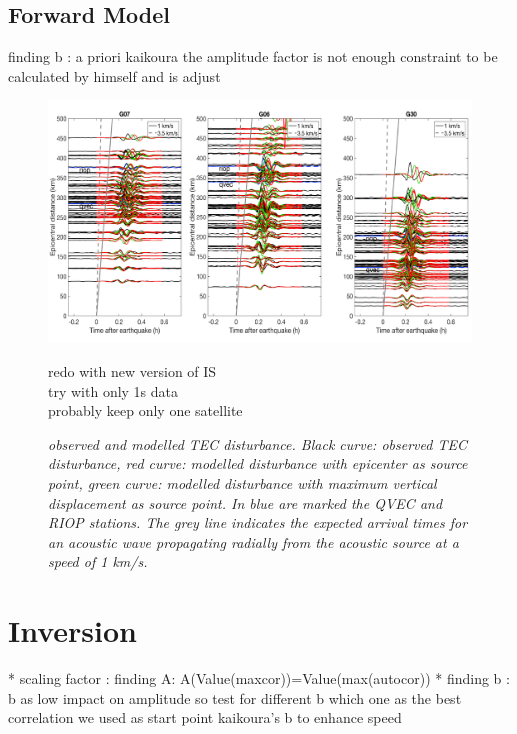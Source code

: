 \documentclass{gji}
\begin{document}
    
   
\subsection{Forward Model}

finding b : a priori kaikoura  
the amplitude factor is not enough constraint to be calculated by himself and is adjust \begin{figure}

\includegraphics[width=0.9\linewidth]{images/Hodo_all_cropped.pdf}

redo with new version of IS \\
try with only 1s data\\
probably keep only one satellite
\caption{ \textit{\emph{observed and modelled TEC disturbance}.  Black curve: observed TEC disturbance, red curve: modelled disturbance with epicenter as source point, green curve: modelled disturbance with maximum vertical displacement as source point. In blue are marked the QVEC and RIOP stations. The grey line indicates the expected arrival times for an acoustic wave propagating radially from the acoustic source at a speed of 1 km/s.}}

\label{hodoseriesall}
\end{figure}

\section{Inversion}

*  scaling factor : finding A:  
                A(Value(maxcor))=Value(max(autocor))
*  finding b : b as low impact on amplitude so test for different b which one as the best correlation 
                    we used as start point kaikoura’s b to enhance speed
\end{document}
